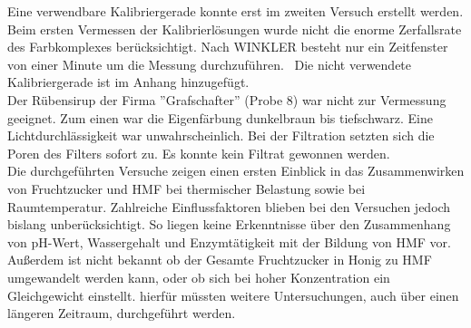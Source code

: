 Eine verwendbare Kalibriergerade konnte erst im zweiten Versuch erstellt werden. Beim ersten Vermessen der Kalibrierlösungen wurde nicht die enorme Zerfallsrate des Farbkomplexes berücksichtigt. Nach WINKLER besteht nur ein Zeitfenster von einer Minute um die Messung durchzuführen.~\cite{Winkler} Die nicht verwendete Kalibriergerade ist im Anhang hinzugefügt.\\
Der Rübensirup der Firma ''Grafschafter'' (Probe 8) war nicht zur Vermessung geeignet. Zum einen war die Eigenfärbung dunkelbraun bis tiefschwarz. Eine Lichtdurchlässigkeit war unwahrscheinlich. Bei der Filtration setzten sich die Poren des Filters sofort zu. Es konnte kein Filtrat gewonnen werden.\\
Die durchgeführten Versuche zeigen einen ersten Einblick in das Zusammenwirken von Fruchtzucker und HMF bei thermischer Belastung sowie bei Raumtemperatur. Zahlreiche Einflussfaktoren blieben bei den Versuchen jedoch bislang unberücksichtigt. So liegen keine Erkenntnisse über den Zusammenhang von pH-Wert, Wassergehalt und Enzymtätigkeit mit der Bildung von HMF vor. Außerdem ist nicht bekannt ob der Gesamte Fruchtzucker in Honig zu HMF umgewandelt werden kann, oder ob sich bei hoher Konzentration ein Gleichgewicht einstellt. hierfür müssten weitere Untersuchungen, auch über einen längeren Zeitraum, durchgeführt werden.